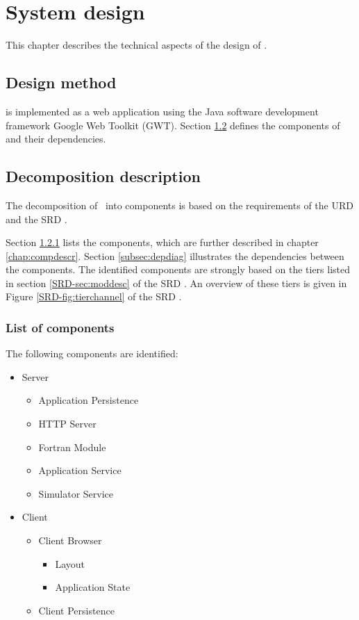 \chapter{System design}
\label{chap:systdesign}
This chapter describes the technical aspects of the design of \projectname.

\section{Design method}
\label{sec:designMethod}
\projectname{} is implemented as a web application using the Java software development framework Google Web Toolkit (GWT). Section \ref{sec:decompdescr} defines the components of \projectname{} and their dependencies.


\section{Decomposition description}
\label{sec:decompdescr}
The decomposition of \projectname\ into components is based on the requirements of the URD \cite{urd} and the SRD \cite{srd}.

\fpstartparagraph{} Section \ref{subsec:complist} lists the components, which are further described in chapter \ref{chap:compdescr}. Section \ref{subsec:depdiag} illustrates the dependencies between the components. The identified components are strongly based on the tiers listed in section \ref*{SRD-sec:moddesc} of the SRD \cite{srd}. An overview of these tiers is given in Figure  \ref*{SRD-fig:tierchannel} of the SRD \cite{srd}.

\subsection{List of components}
\label{subsec:complist}
The following components are identiﬁed:

\begin{itemize}
	\item Server
	\begin{itemize}
		\item Application Persistence
		\item HTTP Server
		\item Fortran Module
		\item Application Service
		\item Simulator Service
	\end{itemize}

\newpage

	\item Client
	\begin{itemize}
		\item Client Browser
	\begin{itemize}
		\item Layout
		\item Application State
	\end{itemize}
		\item Client Persistence
	\end{itemize}
\end{itemize}

